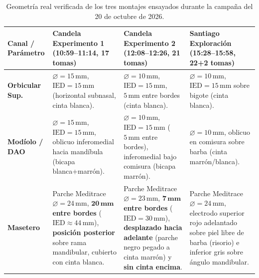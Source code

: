 \documentclass[11pt,a4paper]{article}
\begin{document}
\begin{table}[H]
\centering
\footnotesize
\begin{tabularx}{\textwidth}{l p{3.6cm} p{3.8cm} X}
\toprule
\textbf{Canal / Parámetro} & \textbf{Candela Experimento 1} \newline (10:59--11:14, 17 tomas) & \textbf{Candela Experimento 2} \newline (12:08--12:26, 21 tomas) & \textbf{Santiago Exploración} \newline (15:28--15:58, 22+2 tomas) \\
\midrule
\textbf{Orbicular Sup.} & $\varnothing = 15\,\text{mm}$, $\text{IED} = 15\,\text{mm}$ (horizontal subnasal, cinta blanca). & $\varnothing = 10\,\text{mm}$, $\text{IED} = 15\,\text{mm}$, $5\,\text{mm}$ entre bordes (cinta blanca). & $\varnothing = 10\,\text{mm}$, $\text{IED} = 15\,\text{mm}$ sobre bigote (cinta blanca). \\
\midrule
\textbf{Modíolo / DAO} & $\varnothing = 15\,\text{mm}$, $\text{IED} = 15\,\text{mm}$, oblicuo inferomedial hacia mandíbula (bicapa blanca+marrón). & $\varnothing = 10\,\text{mm}$, $\text{IED} = 15\,\text{mm}$ ($5\,\text{mm}$ entre bordes), inferomedial bajo comisura (bicapa marrón). & $\varnothing = 10\,\text{mm}$, oblicuo en comisura sobre barba (cinta marrón/blanca). \\
\midrule
\textbf{Masetero} & Parche Meditrace $\varnothing = 24\,\text{mm}$, \textbf{$\mathbf{20\,\text{mm}}$ entre bordes} ($\text{IED} \approx 44\,\text{mm}$), \textbf{posición posterior} sobre rama mandibular, cubierto con cinta blanca. & Parche Meditrace $\varnothing = 23\,\text{mm}$, \textbf{$\mathbf{7\,\text{mm}}$ entre bordes} ($\text{IED} = 30\,\text{mm}$), \textbf{desplazado hacia adelante} (parche negro pegado a cinta marrón) y \textbf{sin cinta encima}. & Parche Meditrace $\varnothing = 24\,\text{mm}$, electrodo superior rojo adelantado sobre piel libre de barba (risorio) e inferior gris sobre ángulo mandibular. \\
\bottomrule
\end{tabularx}
\caption{Geometría real verificada de los tres montajes ensayados durante la campaña del 20 de octubre de 2026.}
\label{tab:montajes_reales}
\end{table}
\end{document}
